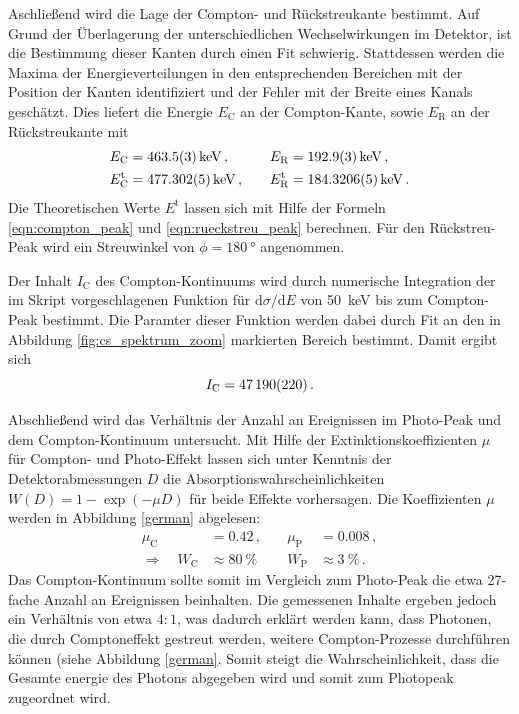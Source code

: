 Aschließend wird die Lage der Compton- und Rückstreukante bestimmt.
Auf Grund der Überlagerung der unterschiedlichen Wechselwirkungen im Detektor,
ist die Bestimmung dieser Kanten durch einen Fit schwierig.
Stattdessen werden die Maxima der Energieverteilungen in den entsprechenden
Bereichen mit der Position der Kanten identifiziert und der Fehler mit
der Breite eines Kanals geschätzt.
Dies liefert die Energie $E_\text{C}$ an der Compton-Kante, sowie $E_\text{R}$
an der Rückstreukante mit
\begin{align*}
    E_\text{C} &= \SI{463.5+-0.3}{keV}\,, &\quad E_\text{R} &= \SI{192.9+-0.3}{keV} \,,\\
    E_\text{C}^\text{t} &= \SI{477.302+-0.005}{keV}\,, &\quad E_\text{R}^\text{t} &= \SI{184.3206+-0.0005}{keV} \,.\\
\end{align*}
Die Theoretischen Werte $E^\text{t}$ lassen sich mit Hilfe der Formeln
\eqref{eqn:compton_peak} und \eqref{eqn:rueckstreu_peak} berechnen. Für
den Rückstreu-Peak wird ein Streuwinkel von $\phi = \SI{180}{\degree}$ angenommen.

Der Inhalt $I_\text{C}$ des Compton-Kontinuums wird durch numerische
Integration der im Skript vorgeschlagenen Funktion für
$\text{d}\sigma/\text{d}E$ von \SI{50}{keV} bis zum Compton-Peak bestimmt.
Die Paramter dieser Funktion werden dabei durch Fit an den in Abbildung
\ref{fig:cs_spektrum_zoom} markierten Bereich bestimmt. Damit ergibt sich
\begin{equation*}
    I_\text{C} = \num{47190+-220}\,.
\end{equation*}

Abschließend wird das Verhältnis der Anzahl an Ereignissen im Photo-Peak
und dem Compton-Kontinuum untersucht.
Mit Hilfe der Extinktionskoeffizienten $\mu$ für Compton- und Photo-Effekt
lassen sich unter Kenntnis der Detektorabmessungen $D$ die Absorptionswahrscheinlichkeiten
$W(D)=1-\exp(-\mu D)$ für beide Effekte vorhersagen. Die Koeffizienten $\mu$
werden in Abbildung \ref{german} abgelesen:
\begin{align*}
    \mu_\text{C} &= \num{0.42}\,, &\quad \mu_\text{P} &= \num{0.008}\,,\\
    \Rightarrow \quad W_\text{C} &\approx \SI{80}{\percent} &\quad W_\text{P} &\approx \SI{3}{\percent} \,.
\end{align*}
Das Compton-Kontinuum sollte somit im Vergleich zum Photo-Peak die etwa
\num{27}-fache Anzahl an Ereignissen beinhalten.
Die gemessenen Inhalte ergeben jedoch ein Verhältnis von etwa $4:1$, was dadurch erklärt werden kann,
dass Photonen, die durch Comptoneffekt gestreut werden, weitere Compton-Prozesse durchführen können
(siehe Abbildung \ref{german}.
Somit steigt die Wahrscheinlichkeit, dass die Gesamte energie des Photons abgegeben wird und somit
zum Photopeak zugeordnet wird.

